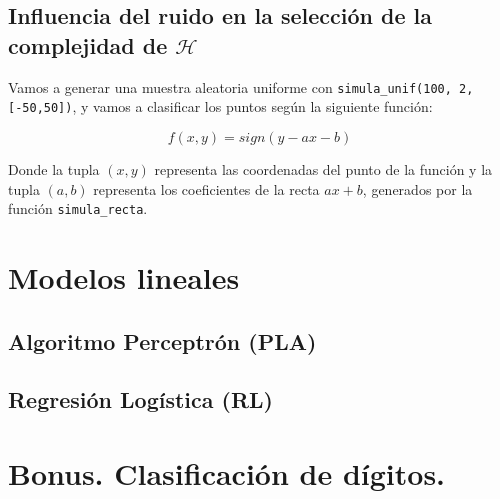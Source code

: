\documentclass{article}
\begin{document}
    \subsection{Influencia del ruido en la selección de la complejidad de $\mathcal{H}$}

    Vamos a generar una muestra aleatoria uniforme con \texttt{simula\_unif(100, 2, [-50,50])}, y vamos a
    clasificar los puntos según la siguiente función:

    \begin{equation*}
        f(x, y) = sign(y - ax - b)
    \end{equation*}

    Donde la tupla $(x,y)$ representa las coordenadas del punto de la función y la tupla $(a,b)$
    representa los coeficientes de la recta $ax + b$, generados por la función \texttt{simula\_recta}.

    \pagebreak

    \section{Modelos lineales}

    \subsection{Algoritmo Perceptrón (PLA)}

    \pagebreak

    \subsection{Regresión Logística (RL)}

    \pagebreak

    \section{Bonus. Clasificación de dígitos.}
\end{document}
